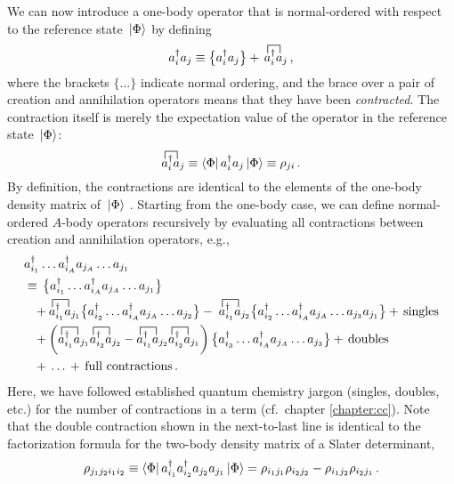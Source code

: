 {We can now introduce a one-body operator that is normal-ordered with respect
to the reference state $\,|{\Phi}\rangle$ by defining
\begin{equation}\label{eq:def_no}
  \aaO_i\aO_j \equiv \nord{\aaO_i\aO_j} +\, \contraction[1.5ex]{}{\aO}{{}^\dag_i}{\aO}\aaO_i\aO_j\,,
\end{equation}
where the brackets $\{\ldots\}$ indicate normal ordering, and the brace 
over a pair of creation and annihilation operators means that
they have been \emph{contracted}. The contraction itself is merely the 
expectation value of the operator in the reference state $\,|{\Phi}\rangle$:
\begin{equation}\label{eq:def_particle_contraction}
  \contraction[1.5ex]{}{\aO}{{}^\dag_i}{\aO}\aaO_i\aO_j \equiv \matrixe{\Phi}{\aaO_i\aO_j}{\Phi} \equiv \rho_{ji} \,.
\end{equation}
By definition, the contractions are identical to the elements of the one-body 
density matrix of $\,|{\Phi}\rangle$ \cite{Ring:1980bb}. Starting from the one-body
case, we can define normal-ordered $A$-body operators recursively by evaluating 
all contractions between creation and annihilation operators, e.g., 
\begin{align}\label{eq:def_no_nbody}
   &\aaO_{i_1}\ldots\aaO_{i_A}\aO_{j_A}\ldots\aO_{j_1} \notag\\
    &\equiv\, \nord{\aaO_{i_1}\ldots\aaO_{i_A}\aO_{j_{A}}\ldots\aO_{j_{1}}} \notag\\
    &\hphantom{\equiv}
       + \contraction[1.5ex]{}{\aO}{{}^\dag_{i_1}}{\aO}\aaO_{i_1}\aO_{j_1} 
        \nord{\aaO_{i_2}\ldots\aaO_{i_A}\aO_{j_{A}}\ldots\aO_{j_{2}}} 
      -\; \contraction[1.5ex]{}{\aO}{{}^\dag_{i_1}}{\aO}\aaO_{i_1}\aO_{j_2} 
        \nord{\aaO_{i_2}\ldots\aaO_{i_A}\aO_{j_A}\ldots\aO_{j_{3}}\aO_{j_{1}}}
      + \text{\,singles}\notag\\
    &\hphantom{\equiv}
       + \left(
          \contraction[1.5ex]{}{\aO}{{}^\dag_{i_1}}{\aO}\aaO_{i_1}\aO_{j_1}
          \contraction[1.5ex]{}{\aO}{{}^\dag_{i_1}}{\aO}\aaO_{i_2}\aO_{j_2}
          -
          \contraction[1.5ex]{}{\aO}{{}^\dag_{i_1}}{\aO}\aaO_{i_1}\aO_{j_2}
          \contraction[1.5ex]{}{\aO}{{}^\dag_{i_1}}{\aO}\aaO_{i_2}\aO_{j_1}
        \right) 
        \nord{\aaO_{i_3}\ldots\aaO_{i_A}\aO_{j_A}\ldots\aO_{j_{3}}} + \text{\,doubles} \notag\\
    &\hphantom{\equiv}
  +\,\ldots\,+ \text{\,full contractions}\,.
\end{align}
Here, we have followed established quantum chemistry jargon (singles, doubles, 
etc.) for the number of contractions in a term (cf.~chapter \ref{chapter:cc}).
Note that the double contraction shown in the next-to-last line is identical
to the factorization formula for the two-body density matrix of a Slater 
determinant,
\begin{equation}
  \rho_{j_1j_2i_1i_2}
  \equiv
  \langle{\Phi}|\,{a^\dag_{i_1}a^\dag_{i_2}a_{j_2}a_{j_1}}\,|{\Phi}\rangle
  = \rho_{i_1j_1}\rho_{i_2j_2}- \rho_{i_1j_2}\rho_{i_2j_1}\,.
\end{equation}

}
